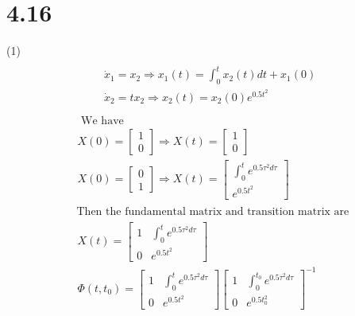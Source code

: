 \documentclass{article}
\begin{document}
\section*{4.16}
(1)
$$
\begin{aligned}
&\begin{array}{l}
\qquad \begin{array}{l}
\dot{x}_{1}=x_{2} \Rightarrow x_{1}(t)=\int_{0}^{t} x_{2}(t) d t+x_{1}(0) \\
\dot{x}_{2}=t x_{2} \Rightarrow x_{2}(t)=x_{2}(0) e^{0.5 t^{2}}
\end{array} \\
~\\
\text { We have } \\
X(0)=\left[\begin{array}{l}
1 \\
0
\end{array}\right] \Rightarrow X(t)=\left[\begin{array}{l}
1 \\
0
\end{array}\right] \\
 X(0)=\left[\begin{array}{l}
0 \\
1
\end{array}\right] \Rightarrow X(t)=\left[\begin{array}{c}
\int_{0}^{t} e^{0.5 \tau^{2} d \tau} \\
e^{0.5 t^{2}}
\end{array}\right]
\end{array}\\
&\text { Then the fundamental matrix and transition matrix are}\\
&\begin{array}{l}
X(t)=\left[\begin{array}{ll}
1 & \int_{0}^{t} e^{0.5 \tau^{2} d \tau} \\
0 & e^{0.5 t^{2}}
\end{array}\right] \\
\Phi\left(t, t_{0}\right)
=\left[\begin{array}{ll}
1 & \int_{0}^{t} e^{0.5 \tau^{2} d \tau} \\
0 & e^{0.5 t^{2}}
\end{array}\right]\left[\begin{array}{ll}
1 & \int_{0}^{t_{0}} e^{0.5 \tau^{2} d \tau} \\
0 & e^{0.5 t_{0}^{2}}
\end{array}\right]^{-1}\\

\end{array}
\end{aligned}$$
\end{document}
